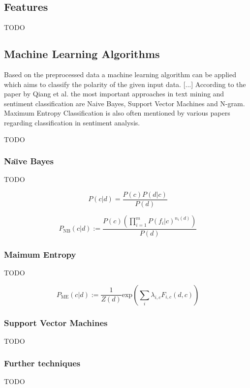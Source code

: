 \subsection{Features}

TODO

\subsection{Machine Learning Algorithms}

Based on the preprocessed data a machine learning algorithm can be applied which aims to classify the polarity of the given input data. [...]
According to the paper by Qiang et al.\autocite{Ye20096527} the most important approaches in 
text mining and sentiment classification are Naive Bayes, Support Vector Machines and 
N-gram. Maximum Entropy Classification is also often mentioned by various papers regarding 
classification in sentiment analysis.

TODO

\subsubsection*{Na\"{\i}ve Bayes}

TODO

\begin{equation*}
P(c \vert d) = \frac{P(c)P(d \vert c)}{P(d)}
\end{equation*}

\begin{equation*}
P_{\mathrm{NB}}(c \vert d) := \frac{P(c)(\prod^{m}_{i=1}P(f_i \vert c)^{n_i(d)})}{P(d)}
\end{equation*}

\subsubsection*{Maimum Entropy}

TODO

\begin{equation*}
P_{\mathrm{ME}}(c \vert d) := \frac{1}{Z(d)}\mathrm{exp}\left( \sum_{i} \lambda_{i,c} F_{i,c}(d,c) \right)
\end{equation*}

\subsubsection*{Support Vector Machines}

TODO

\subsubsection*{Further techniques}

TODO